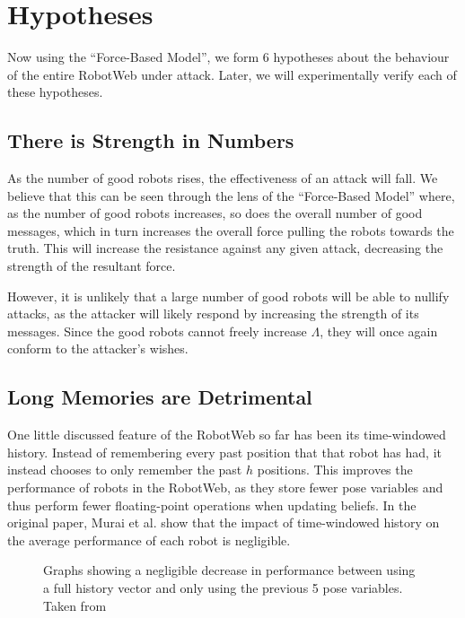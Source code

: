 \section{Hypotheses} \label{section:6hyp}
Now using the ``Force-Based Model'', we form 6 hypotheses about the behaviour of the entire RobotWeb under attack. Later, we will experimentally verify each of these hypotheses.

\subsection{There is Strength in Numbers} \label{hyp:strength_in_numbers}
As the number of good robots rises, the effectiveness of an attack will fall. We believe that this can be seen through the lens of the ``Force-Based Model'' where, as the number of good robots increases, so does the overall number of good messages, which in turn increases the overall force pulling the robots towards the truth. This will increase the resistance against any given attack, decreasing the strength of the resultant force.

However, it is unlikely that a large number of good robots will be able to nullify attacks, as the attacker will likely respond by increasing the strength of its messages. Since the good robots cannot freely increase $\Lambda$, they will once again conform to the attacker's wishes.

\subsection{Long Memories are Detrimental} \label{hyp:history} %
One little discussed feature of the RobotWeb so far has been its time-windowed history. Instead of remembering every past position that that robot has had, it instead chooses to only remember the past $h$ positions. This improves the performance of robots in the RobotWeb, as they store fewer pose variables and thus perform fewer floating-point operations when updating beliefs. In the original paper, Murai et al. show that the impact of time-windowed history on the average performance of each robot is negligible.


\begin{figure}[!h]
    \centering
	\caption[The negligible effect of using time-windowed history]{Graphs showing a negligible decrease in performance between using a full history vector and only using the previous 5 pose variables. Taken from \cite[Figure~3]{Robotweb}}
\end{figure}


